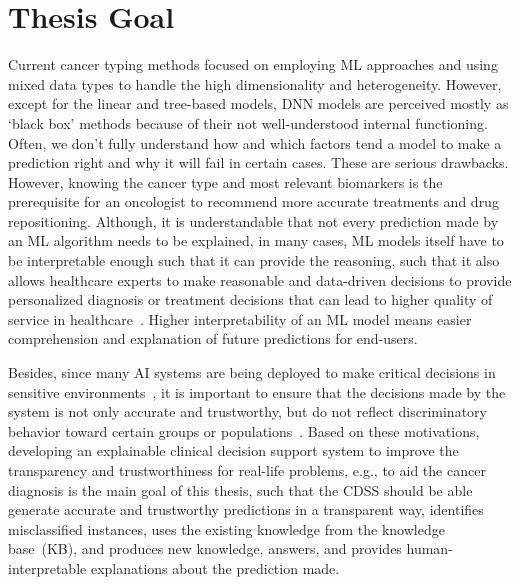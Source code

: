\section{Thesis Goal} \label{thesis_goal}
Current cancer typing methods focused on employing ML approaches and using mixed data types to handle the high dimensionality and heterogeneity. However, except for the linear and tree-based models, DNN models are perceived mostly as `black box' methods because of their not well-understood internal functioning. Often, we don't fully understand how and which factors tend a model to make a prediction right and why it will fail in certain cases. These are serious drawbacks. However, knowing the cancer type and most relevant biomarkers is the prerequisite for an oncologist to recommend more accurate treatments and drug repositioning. 
Although, it is understandable that not every prediction made by an ML algorithm needs to be explained, in many cases, ML models itself have to be interpretable enough such that it can provide the reasoning, such that it also allows healthcare experts to make reasonable and data-driven decisions to provide personalized diagnosis or treatment decisions that can lead to higher quality of service in healthcare~\cite{stiglic2020interpretability}.
Higher interpretability of an ML model means easier comprehension and explanation of future predictions for end-users. 

\hspace*{3.5mm} Besides, since many AI systems are being deployed to make critical decisions in sensitive environments~\cite{stiglic2020interpretability}, it is important to ensure that the decisions made by the system is not only accurate and trustworthy, but do not reflect discriminatory behavior toward certain groups or populations~\cite{mehrabi2019survey}. Based on these motivations, developing an explainable clinical decision support system to improve the transparency and trustworthiness for real-life problems, e.g., to aid the cancer diagnosis is the main goal of this thesis, such that the CDSS should be able generate accurate and trustworthy predictions in a transparent way, identifies misclassified instances, uses the existing knowledge from the knowledge base~(KB), and produces new knowledge, answers, and provides human-interpretable explanations about the prediction made. 

